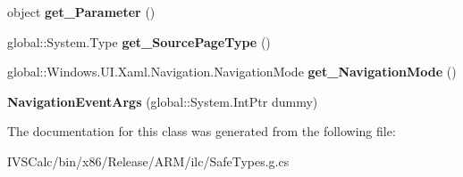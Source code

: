 \begin{DoxyCompactItemize}
object {\bfseries get\+\_\+\+Parameter} ()
\item 
\mbox{\label{class_windows_1_1_u_i_1_1_xaml_1_1_navigation_1_1_navigation_event_args_ac40ea82c6530db5f1c147e0d50f539d5}} 
global\+::\+System.\+Type {\bfseries get\+\_\+\+Source\+Page\+Type} ()
\item 
\mbox{\label{class_windows_1_1_u_i_1_1_xaml_1_1_navigation_1_1_navigation_event_args_a49b9eb754f028f3775a11aa7e9b33ecd}} 
global\+::\+Windows.\+U\+I.\+Xaml.\+Navigation.\+Navigation\+Mode {\bfseries get\+\_\+\+Navigation\+Mode} ()
\item 
\mbox{\label{class_windows_1_1_u_i_1_1_xaml_1_1_navigation_1_1_navigation_event_args_a78e228ec4fa7026f8047bfe00cd0eae8}} 
{\bfseries Navigation\+Event\+Args} (global\+::\+System.\+Int\+Ptr dummy)
\end{DoxyCompactItemize}


The documentation for this class was generated from the following file\+:\begin{DoxyCompactItemize}
\item 
I\+V\+S\+Calc/bin/x86/\+Release/\+A\+R\+M/ilc/Safe\+Types.\+g.\+cs\end{DoxyCompactItemize}
